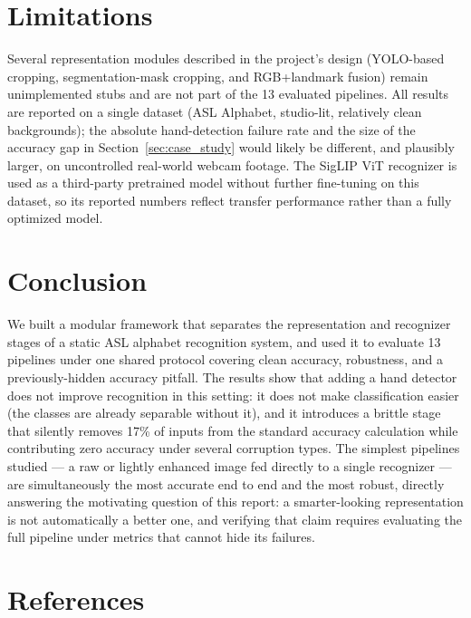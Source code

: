 \documentclass[11pt,a4paper]{article}
\begin{document}
\section{Limitations}

Several representation modules described in the project's design
(YOLO-based cropping, segmentation-mask cropping, and RGB+landmark fusion)
remain unimplemented stubs and are not part of the 13 evaluated pipelines.
All results are reported on a single dataset (ASL Alphabet, studio-lit,
relatively clean backgrounds); the absolute hand-detection failure rate and
the size of the accuracy gap in Section~\ref{sec:case_study} would likely be
different, and plausibly larger, on uncontrolled real-world webcam footage.
The SigLIP ViT recognizer is used as a third-party pretrained model without
further fine-tuning on this dataset, so its reported numbers reflect transfer
performance rather than a fully optimized model.

\section{Conclusion}

We built a modular framework that separates the representation and recognizer
stages of a static ASL alphabet recognition system, and used it to evaluate 13
pipelines under one shared protocol covering clean accuracy, robustness, and
a previously-hidden accuracy pitfall. The results show that adding a hand
detector does not improve recognition in this setting: it does not make
classification easier (the classes are already separable without it), and it
introduces a brittle stage that silently removes 17\% of inputs from the
standard accuracy calculation while contributing zero accuracy under several
corruption types. The simplest pipelines studied --- a raw or lightly enhanced
image fed directly to a single recognizer --- are simultaneously the most
accurate end to end and the most robust, directly answering the motivating
question of this report: a smarter-looking representation is not automatically
a better one, and verifying that claim requires evaluating the full pipeline
under metrics that cannot hide its failures.

\section{References}
\end{document}
